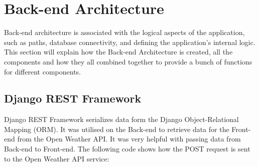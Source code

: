 \section{Back-end Architecture}
\label{BackEnd}
Back-end architecture is associated with the logical aspects of the application, such as paths, database connectivity, and defining the application's internal logic. This section will explain how  the Back-end Architecture is created, all the components and how they all combined together to provide a bunch of functions for different components.

\subsection{Django REST Framework}
Django REST Framework serializes data form the Django Object-Relational Mapping (ORM). It was utilised on the Back-end to retrieve data for the Front-end from the Open Weather API. It was very helpful with passing data from Back-end to Front-end. The following code shows how the POST request is sent to the Open Weather API service:

